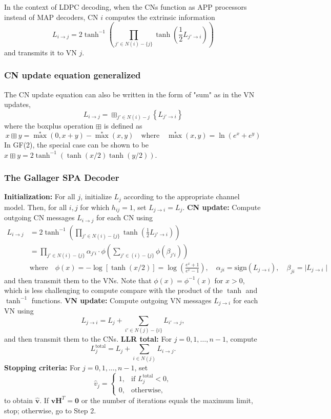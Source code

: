 \documentclass[11pt]{article}
\begin{document}
In the context of LDPC decoding, when the CNs function as APP processors instead of MAP decoders, CN $i$ computes the extrinsic information
\[
\boxed{
L_{i \to j} = 2\tanh^{-1}\left(\prod_{j' \in N(i)-\{j\}} \tanh\left(\frac{1}{2}L_{j' \to i}\right)\right)
}
\]
and transmits it to VN $j$. 
\subsubsection{CN update equation generalized}
The CN update equation can also be written in the form of "sum" as in the VN updates,
\[
\boxed{
L_{i \to j} = \boxplus_{j' \in N(i) - {j}} \left\{ L_{j' \to i} \right\}
}
\]
where the boxplus operation $\boxplus$ is defined as
\[
x \boxplus y = \max^* (0, x+y) - \max^*(x,y) \quad \text{where} \quad \max^*(x,y) = \ln (e^x + e^y)
\]
In GF(2), the special case can be shown to be $x \boxplus y = 2\tanh^{-1}(\tanh(x/2) \tanh(y/2))$.


\subsubsection{The Gallager SPA Decoder}

\begin{algorithm}[H]
\caption{The Gallager Sum-Product Algorithm}
\begin{algorithmic}[1]
\State \textbf{Initialization:} For all $j$, initialize $L_j$ according to the appropriate channel model. Then, for all $i,j$ for which $h_{ij} = 1$, set $L_{j \to i} = L_j$.
\State \textbf{CN update:} Compute outgoing CN messages $L_{i \to j}$ for each CN using
  \[
  \begin{aligned}
  L_{i \to j} &= 2\tanh^{-1}\left(\prod_{j' \in N(i)-\{j\}} \tanh\left(\frac{1}{2}L_{j' \to i}\right)\right) \\
  &= \prod_{j' \in N(i)-\{j\}} \alpha_{j'i} \cdot \phi\left( \sum_{j' \in (i)-\{j\}} \phi(\beta_{j'i}) \right) \\
  & \text{where}\quad \phi(x) =-\log [\tanh (x/2)] = \log(\frac{e^x + 1}{e^x - 1}),\quad \alpha_{ji} = \text{sign}(L_{j \to i}),\quad \beta_{ji} = \mid L_{j \to i} \mid
  \end{aligned}
  \]
  and then transmit them to the VNs. Note that $\phi (x) = \phi ^ {-1}(x)$ for $x > 0$, which is less challenging to compute compare with the product of the $\tanh$ and $\tanh^{-1}$ functions.
\State \textbf{VN update:} Compute outgoing VN messages $L_{j \to i}$ for each VN using
  \[
  L_{j \to i} = L_j + \sum_{i' \in N(j)-\{i\}} L_{i' \to j},
  \]
  and then transmit them to the CNs.
\State \textbf{LLR total:} For $j = 0,1,\ldots,n-1$, compute
  \[
  L_j^{\text{total}} = L_j + \sum_{i \in N(j)} L_{i \to j}.
  \]
\State \textbf{Stopping criteria:} For $j = 0,1,\ldots,n-1$, set
  \[
  \hat{v}_j =
  \begin{cases}
  1, & \text{if } L_j^{\text{total}} < 0, \\
  0, & \text{otherwise,}
  \end{cases}
  \]
  to obtain $\hat{\mathbf{v}}$. If $\hat{\mathbf{v}}\mathbf{H}^{T} = \mathbf{0}$ or the number of iterations equals the maximum limit, stop; otherwise, go to Step 2.
\end{algorithmic}
\end{algorithm}
\end{document}
